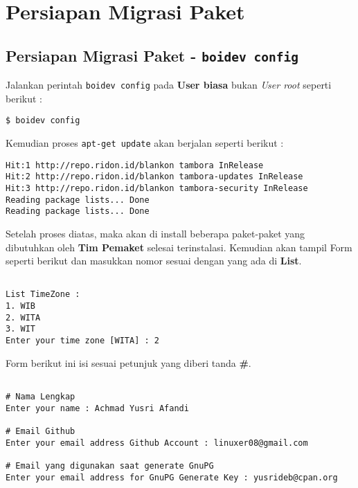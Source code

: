 {\section{Persiapan Migrasi Paket}
\subsection{Persiapan Migrasi Paket - \texttt{boidev config}}
\label{implm_1}
\noindent
Jalankan perintah \texttt{boidev config} pada \textbf{User biasa} bukan \textit{User root} seperti berikut :

\begin{lstlisting}[language=ShellBash]
$ boidev config
\end{lstlisting}

\noindent
Kemudian proses \texttt{apt-get update} akan berjalan seperti berikut :

\begin{lstlisting}[language=ShellBash]
Hit:1 http://repo.ridon.id/blankon tambora InRelease
Hit:2 http://repo.ridon.id/blankon tambora-updates InRelease
Hit:3 http://repo.ridon.id/blankon tambora-security InRelease
Reading package lists... Done                      
Reading package lists... Done

\end{lstlisting}

\noindent
Setelah proses diatas, maka akan di install beberapa paket-paket yang dibutuhkan oleh \textbf{Tim Pemaket} selesai terinstalasi. Kemudian akan tampil Form seperti berikut dan masukkan nomor sesuai dengan yang ada di \textbf{List}.

\begin{lstlisting}[language=ShellBash]

List TimeZone : 
1. WIB 
2. WITA 
3. WIT 
Enter your time zone [WITA] : 2

\end{lstlisting}

\noindent
Form berikut ini isi sesuai petunjuk yang diberi tanda \textbf{\#}.

\begin{lstlisting}[language=ShellBash]

# Nama Lengkap
Enter your name : Achmad Yusri Afandi

# Email Github
Enter your email address Github Account : linuxer08@gmail.com

# Email yang digunakan saat generate GnuPG
Enter your email address for GnuPG Generate Key : yusrideb@cpan.org



\end{lstlisting}}

